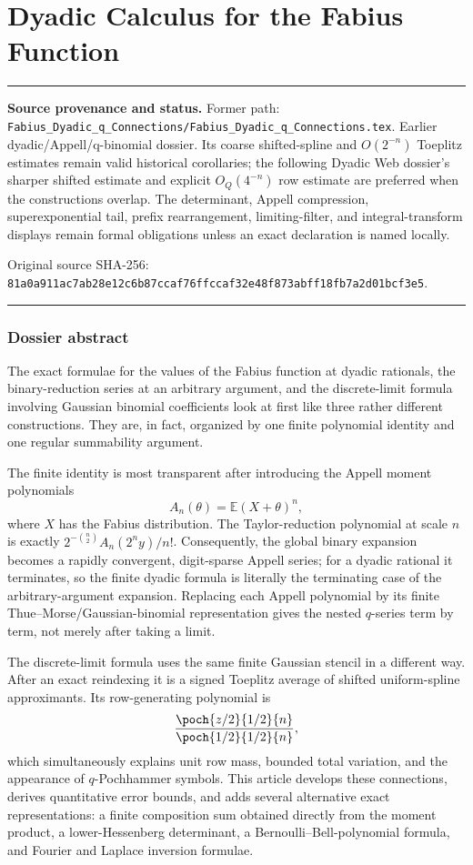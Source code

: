 \documentclass[11pt,oneside]{article}
\theoremstyle{definition}
\theoremstyle{remark}
\newcommand{\E}{\mathbb E}
\newenvironment{boxedremark}{%
  \par\smallskip\noindent\begin{center}\begin{minipage}{0.94\textwidth}%
  \color{black}\hrule\vspace{0.6em}\small
}{%
  \vspace{0.6em}\hrule\end{minipage}\end{center}\smallskip
}
\begin{document}
\part{Dyadic Calculus for the Fabius Function}
\label{part:dyadicq}
\begin{boxedremark}
\textbf{Source provenance and status.} Former path: \nolinkurl{Fabius_Dyadic_q_Connections/Fabius_Dyadic_q_Connections.tex}.  Earlier dyadic/Appell/q-binomial dossier.  Its coarse shifted-spline and \(O(2^{-n})\) Toeplitz estimates remain valid historical corollaries; the following Dyadic Web dossier's sharper shifted estimate and explicit \(O_Q(4^{-n})\) row estimate are preferred when the constructions overlap.  The determinant, Appell compression, superexponential tail, prefix rearrangement, limiting-filter, and integral-transform displays remain formal obligations unless an exact declaration is named locally.\par\smallskip Original source SHA-256: \nolinkurl{81a0a911ac7ab28e12c6b87ccaf76ffccaf32e48f873abff18fb7a2d01bcf3e5}.
\end{boxedremark}
\section*{Dossier abstract}
The exact formulae for the values of the Fabius function at dyadic rationals,
the binary-reduction series at an arbitrary argument, and the discrete-limit
formula involving Gaussian binomial coefficients look at first like three
rather different constructions.  They are, in fact, organized by one finite
polynomial identity and one regular summability argument.

The finite identity is most transparent after introducing the Appell moment
polynomials
\[
  A_n(\theta)=\E (X+\theta)^n,
\]
where $X$ has the Fabius distribution.  The Taylor-reduction polynomial at
scale $n$ is exactly $2^{-\binom n2}A_n(2^n y)/n!$.  Consequently, the global
binary expansion becomes a rapidly convergent, digit-sparse Appell series;
for a dyadic rational it terminates, so the finite dyadic formula is literally
the terminating case of the arbitrary-argument expansion.  Replacing each
Appell polynomial by its finite Thue--Morse/Gaussian-binomial representation
gives the nested $q$-series term by term, not merely after taking a limit.

The discrete-limit formula uses the same finite Gaussian stencil in a different
way.  After an exact reindexing it is a signed Toeplitz average of shifted
uniform-spline approximants.  Its row-generating polynomial is
\[
  \frac{\poch{z/2}{1/2}{n}}{\poch{1/2}{1/2}{n}},
\]
which simultaneously explains unit row mass, bounded total variation, and the
appearance of $q$-Pochhammer symbols.  This article develops these connections,
derives quantitative error bounds, and adds several alternative exact
representations: a finite composition sum obtained directly from the moment
product, a lower-Hessenberg determinant, a Bernoulli--Bell-polynomial formula,
and Fourier and Laplace inversion formulae.
\end{document}
